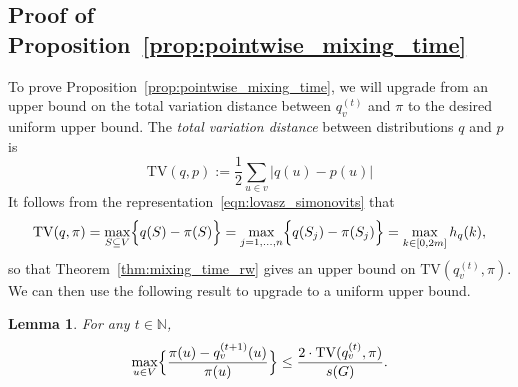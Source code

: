 \documentclass{article}
\newcommand{\1}{\mathbf{1}}
\newtheorem{lemma}{Lemma}[section]
\theoremstyle{definition}
\theoremstyle{remark}
\begin{document}
\subsection{Proof of Proposition~\ref{prop:pointwise_mixing_time}}
\label{subsec:pf_prop_pointwise_mixing_time}
To prove Proposition~\ref{prop:pointwise_mixing_time}, we will upgrade from an upper bound on the total variation distance between $q_v^{(t)}$ and $\pi$ to the desired uniform upper bound. The \emph{total variation distance} between distributions $q$ and $p$ is
\begin{equation*}
\mathrm{TV}(q,p) := \frac{1}{2}\sum_{u \in v} \bigl|q(u) - p(u)\bigr|
\end{equation*}
It follows from the representation~\eqref{eqn:lovasz_simonovits} that
\begin{equation*}
\mathrm{TV}(q,\pi) = \max_{S \subseteq V} \Bigl\{q(S) - \pi(S)\Bigr\} = \max_{j = 1,\ldots,n} \Bigl\{q(S_j) - \pi(S_j)\Bigr\} = \max_{k \in [0,2m]} h_q(k),
\end{equation*}
so that Theorem~\ref{thm:mixing_time_rw} gives an upper bound on $\mathrm{TV}(q_v^{(t)},\pi)$. We can then use the following result to upgrade to a uniform upper bound.

\begin{lemma}
	\label{lem:tv_to_pointwise}
	For any $t \in \mathbb{N}$,
	\begin{equation*}
	\max_{u \in V} \Bigl\{\frac{\pi(u) - q_v^{(t + 1)}(u)}{\pi(u)}\Bigr\} \leq \frac{2 \cdot \mathrm{TV}(q_v^{(t)}, \pi)}{s(G)}.
	\end{equation*}
\end{lemma}
\end{document}
